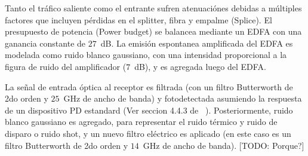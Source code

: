 Tanto el tráfico saliente como el entrante sufren atenuaciónes debidas a múltiples factores que incluyen pérdidas en el splitter, fibra y empalme (Splice). El presupuesto de potencia (Power budget) se balancea mediante un EDFA con una ganancia constante de $27$~dB. La emisión espontanea amplificada del EDFA es modelada como ruido blanco gaussiano, con una intensidad proporcional a la figura de ruido del amplificador ($7$~dB), y es agregada luego del EDFA.



La señal de entrada óptica al receptor es filtrada (con un filtro Butterworth de 2do orden y $25$~GHz de ancho de banda) y fotodetectada asumiendo la respuesta de un dispositivo PD estandard (Ver seccion 4.4.3 de ~\cite{Agrawal:xx}).
Posteriormente, ruido blanco gaussiano es agregado, para representar el ruido térmico y ruido de disparo o ruido shot, y un nuevo filtro eléctrico es aplicado (en este caso es un filtro Butterworth de 2do orden y $14$~GHz de ancho de banda). [TODO: Porque?]



